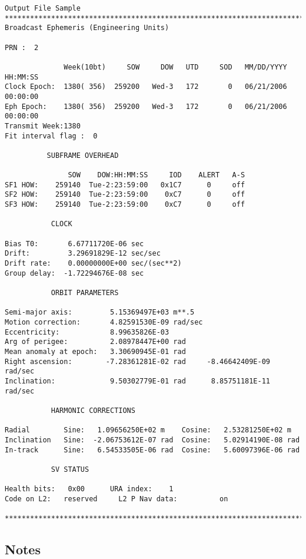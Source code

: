 \begin{verbatim}
Output File Sample
****************************************************************************
Broadcast Ephemeris (Engineering Units)

PRN :  2

              Week(10bt)     SOW     DOW   UTD     SOD   MM/DD/YYYY   HH:MM:SS
Clock Epoch:  1380( 356)  259200   Wed-3   172       0   06/21/2006   00:00:00
Eph Epoch:    1380( 356)  259200   Wed-3   172       0   06/21/2006   00:00:00
Transmit Week:1380
Fit interval flag :  0

          SUBFRAME OVERHEAD

               SOW    DOW:HH:MM:SS     IOD    ALERT   A-S
SF1 HOW:    259140  Tue-2:23:59:00   0x1C7      0     off
SF2 HOW:    259140  Tue-2:23:59:00    0xC7      0     off
SF3 HOW:    259140  Tue-2:23:59:00    0xC7      0     off

           CLOCK

Bias T0:       6.67711720E-06 sec
Drift:         3.29691829E-12 sec/sec
Drift rate:    0.00000000E+00 sec/(sec**2)
Group delay:  -1.72294676E-08 sec

           ORBIT PARAMETERS

Semi-major axis:         5.15369497E+03 m**.5
Motion correction:       4.82591530E-09 rad/sec
Eccentricity:            8.99635826E-03
Arg of perigee:          2.08978447E+00 rad
Mean anomaly at epoch:   3.30690945E-01 rad
Right ascension:        -7.28361281E-02 rad     -8.46642409E-09 rad/sec
Inclination:             9.50302779E-01 rad      8.85751181E-11 rad/sec

           HARMONIC CORRECTIONS

Radial        Sine:   1.09656250E+02 m    Cosine:   2.53281250E+02 m
Inclination   Sine:  -2.06753612E-07 rad  Cosine:   5.02914190E-08 rad
In-track      Sine:   6.54533505E-06 rad  Cosine:   5.60097396E-06 rad

           SV STATUS

Health bits:   0x00      URA index:    1
Code on L2:   reserved     L2 P Nav data:          on

****************************************************************************
\end{verbatim}
\subsection{Notes}

